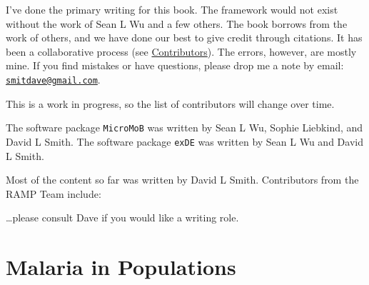 \documentclass[
]{book}
\begin{document}
I've done the primary writing for this book. The framework would not exist without the work of Sean L Wu and a few others. The book borrows from the work of others, and we have done our best to give credit through citations. It has been a collaborative process (see \protect\hyperlink{contributors}{Contributors}). The errors, however, are mostly mine. If you find mistakes or have questions, please drop me a note by email: \href{mailto:smitdave@gmail.com}{\nolinkurl{smitdave@gmail.com}}.

This is a work in progress, so the list of contributors will change over time.

The software package \texttt{MicroMoB} was written by Sean L Wu, Sophie Liebkind, and David L Smith. The software package \texttt{exDE} was written by Sean L Wu and David L Smith.

Most of the content so far was written by David L Smith. Contributors from the RAMP Team include:

\ldots please consult Dave if you would like a writing role.

\hypertarget{malaria-in-populations}{%
\chapter{Malaria in Populations}\label{malaria-in-populations}}
\end{document}
